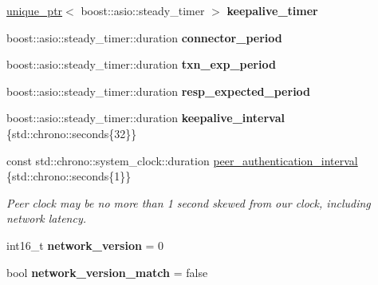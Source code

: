 \begin{DoxyCompactItemize}
\mbox{\hyperlink{classfc_1_1unique__ptr}{unique\+\_\+ptr}}$<$ boost\+::asio\+::steady\+\_\+timer $>$ {\bfseries keepalive\+\_\+timer}
\item 
\mbox{\label{classaacio_1_1net__plugin__impl_a7e8789a86363b9fc628941cb8244543a}} 
boost\+::asio\+::steady\+\_\+timer\+::duration {\bfseries connector\+\_\+period}
\item 
\mbox{\label{classaacio_1_1net__plugin__impl_a52693c7b5340b78ba3ef3578dc7ca54e}} 
boost\+::asio\+::steady\+\_\+timer\+::duration {\bfseries txn\+\_\+exp\+\_\+period}
\item 
\mbox{\label{classaacio_1_1net__plugin__impl_aae88a80e956ff231c81fca2432b787de}} 
boost\+::asio\+::steady\+\_\+timer\+::duration {\bfseries resp\+\_\+expected\+\_\+period}
\item 
\mbox{\label{classaacio_1_1net__plugin__impl_afa245923ae90306edb85a8510d169eee}} 
boost\+::asio\+::steady\+\_\+timer\+::duration {\bfseries keepalive\+\_\+interval} \{std\+::chrono\+::seconds\{32\}\}
\item 
\mbox{\label{classaacio_1_1net__plugin__impl_a914d4c817a8b2c87d2f0891dec497944}} 
const std\+::chrono\+::system\+\_\+clock\+::duration \mbox{\hyperlink{classaacio_1_1net__plugin__impl_a914d4c817a8b2c87d2f0891dec497944}{peer\+\_\+authentication\+\_\+interval}} \{std\+::chrono\+::seconds\{1\}\}
\begin{DoxyCompactList}\small\item\em Peer clock may be no more than 1 second skewed from our clock, including network latency. \end{DoxyCompactList}\item 
\mbox{\label{classaacio_1_1net__plugin__impl_aa389cbe6ee3dfe8f0a64a2641a5dbccf}} 
int16\+\_\+t {\bfseries network\+\_\+version} = 0
\item 
\mbox{\label{classaacio_1_1net__plugin__impl_ae60d17e19743e3def020e8dcc6804274}} 
bool {\bfseries network\+\_\+version\+\_\+match} = false
\item 
\mbox{\label{classaacio_1_1net__plugin__impl_af69594424172f9028ece788645679874}} 

\end{DoxyCompactItemize}

